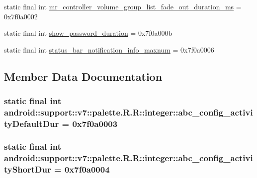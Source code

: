 \begin{CompactItemize}
\item 
static final int \hyperlink{classandroid_1_1support_1_1v7_1_1palette_1_1_r_1_1integer_feb0a68842c88d607e418db66a57efdd}{mr\_\-controller\_\-volume\_\-group\_\-list\_\-fade\_\-out\_\-duration\_\-ms} = 0x7f0a0002
\item 
static final int \hyperlink{classandroid_1_1support_1_1v7_1_1palette_1_1_r_1_1integer_c504fbbc867daeb2f114eb212a83e264}{show\_\-password\_\-duration} = 0x7f0a000b
\item 
static final int \hyperlink{classandroid_1_1support_1_1v7_1_1palette_1_1_r_1_1integer_64fb4a73d8685666c775f684c018f18f}{status\_\-bar\_\-notification\_\-info\_\-maxnum} = 0x7f0a0006
\end{CompactItemize}


\subsection{Member Data Documentation}
\hypertarget{classandroid_1_1support_1_1v7_1_1palette_1_1_r_1_1integer_b1f70aa031b84aef647cf23dbf58f075}{
\subsubsection[{abc\_\-config\_\-activityDefaultDur}]{\setlength{\rightskip}{0pt plus 5cm}static final int android::support::v7::palette.R.R::integer::abc\_\-config\_\-activityDefaultDur = 0x7f0a0003}}
\label{classandroid_1_1support_1_1v7_1_1palette_1_1_r_1_1integer_b1f70aa031b84aef647cf23dbf58f075}


\hypertarget{classandroid_1_1support_1_1v7_1_1palette_1_1_r_1_1integer_cc7d7cc21e41aaa1beefcc10ff5d8df8}{
\subsubsection[{abc\_\-config\_\-activityShortDur}]{\setlength{\rightskip}{0pt plus 5cm}static final int android::support::v7::palette.R.R::integer::abc\_\-config\_\-activityShortDur = 0x7f0a0004}}
\label{classandroid_1_1support_1_1v7_1_1palette_1_1_r_1_1integer_cc7d7cc21e41aaa1beefcc10ff5d8df8}



